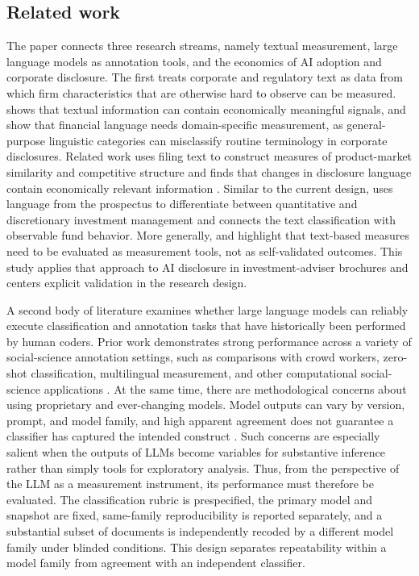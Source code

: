 \documentclass[utf8]{FrontiersinHarvard}
\begin{document}
\subsection{Related work}

The paper connects three research streams, namely textual measurement, large language models as annotation tools, and the economics of AI adoption and corporate disclosure. The first treats corporate and regulatory text as data from which firm characteristics that are otherwise hard to observe can be measured. \citet{tetlock2007} shows that textual information can contain economically meaningful signals, and \citet{loughran2011,loughran2016} show that financial language needs domain-specific measurement, as general-purpose linguistic categories can misclassify routine terminology in corporate disclosures. Related work uses filing text to construct measures of product-market similarity and competitive structure \citep{hoberg2016} and finds that changes in disclosure language contain economically relevant information \citep{cohenLazy2020}. Similar to the current design, \citet{abis2022} uses language from the prospectus to differentiate between quantitative and discretionary investment management and connects the text classification with observable fund behavior. More generally, \citet{grimmer2013} and \citet{gentzkow2019} highlight that text-based measures need to be evaluated as measurement tools, not as self-validated outcomes. This study applies that approach to AI disclosure in investment-adviser brochures and centers explicit validation in the research design.

A second body of literature examines whether large language models can reliably execute classification and annotation tasks that have historically been performed by human coders. Prior work demonstrates strong performance across a variety of social-science annotation settings, such as comparisons with crowd workers, zero-shot classification, multilingual measurement, and other computational social-science applications \citep{gilardi2023,tornberg2023,ziems2024,rathje2024}. At the same time, there are methodological concerns about using proprietary and ever-changing models. Model outputs can vary by version, prompt, and model family, and high apparent agreement does not guarantee a classifier has captured the intended construct \citep{bommasani2021,ollion2024}. Such concerns are especially salient when the outputs of LLMs become variables for substantive inference rather than simply tools for exploratory analysis. Thus, from the perspective of the LLM as a measurement instrument, its performance must therefore be evaluated. The classification rubric is prespecified, the primary model and snapshot are fixed, same-family reproducibility is reported separately, and a substantial subset of documents is independently recoded by a different model family under blinded conditions. This design separates repeatability within a model family from agreement with an independent classifier.
\end{document}
